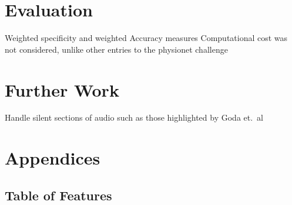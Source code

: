 \documentclass[titlepage, 12pt]{scrartcl} \usepackage{enumitem}
\begin{document}
\section{Evaluation}\label{Eval}
Weighted specificity and weighted Accuracy measures
Computational cost was not considered, unlike other entries to the physionet
challenge
\section{Further Work}\label{FurtherWork}
Handle silent sections of audio such as those highlighted by Goda et.\
al~\parencite{Goda2016}

\appendix
\section*{Appendices}
\renewcommand{\thesubsection}{\Alph{subsection}}
\subsection{Table of Features}
\end{document}
